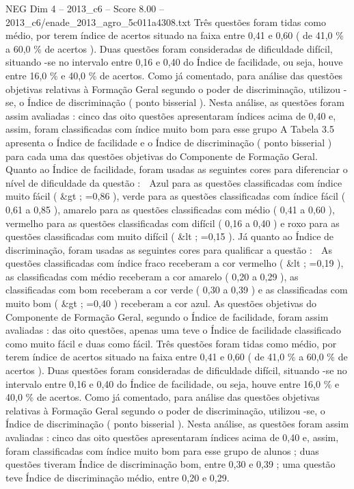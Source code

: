 \begin{textsample}{NEG Dim 4 – 2013\_c6 – Score 8.00 – 2013\_c6/enade\_2013\_agro\_5c011a4308.txt}
Três questões foram tidas como médio, por terem índice de acertos situado na faixa entre 0,41 e 0,60 ( de 41,0 \% a 60,0 \% de acertos ).
Duas questões foram consideradas de dificuldade difícil, situando -se no intervalo entre 0,16 e 0,40 do Índice de facilidade, ou seja, houve entre 16,0 \% e 40,0 \% de acertos.
Como já comentado, para análise das questões objetivas relativas à Formação Geral segundo o poder de discriminação, utilizou -se, o Índice de discriminação ( ponto bisserial ).
Nesta análise, as questões foram assim avaliadas : cinco das oito questões apresentaram índices acima de 0,40 e, assim, foram classificadas com índice muito bom para esse grupo A Tabela 3.5 apresenta o Índice de facilidade e o Índice de discriminação ( ponto bisserial ) para cada uma das questões objetivas do Componente de Formação Geral.
Quanto ao Índice de facilidade, foram usadas as seguintes cores para diferenciar o nível de dificuldade da questão :  Azul para as questões classificadas com índice muito fácil ( \&gt ; =0,86 ), verde para as questões classificadas com índice fácil ( 0,61 a 0,85 ), amarelo para as questões classificadas com médio ( 0,41 a 0,60 ), vermelho para as questões classificadas com difícil ( 0,16 a 0,40 ) e roxo para as questões classificadas com muito difícil ( \&lt ; =0,15 ).
Já quanto ao Índice de discriminação, foram usadas as seguintes cores para qualificar a questão :  As questões classificadas com índice fraco receberam a cor vermelho ( \&lt ; =0,19 ), as classificadas com médio receberam a cor amarelo ( 0,20 a 0,29 ), as classificadas com bom receberam a cor verde ( 0,30 a 0,39 ) e as classificadas com muito bom ( \&gt ; =0,40 ) receberam a cor azul.
As questões objetivas do Componente de Formação Geral, segundo o Índice de facilidade, foram assim avaliadas : das oito questões, apenas uma teve o Índice de facilidade classificado como muito fácil e duas como fácil.
Três questões foram tidas como médio, por terem índice de acertos situado na faixa entre 0,41 e 0,60 ( de 41,0 \% a 60,0 \% de acertos ).
Duas questões foram consideradas de dificuldade difícil, situando -se no intervalo entre 0,16 e 0,40 do Índice de facilidade, ou seja, houve entre 16,0 \% e 40,0 \% de acertos.
Como já comentado, para análise das questões objetivas relativas à Formação Geral segundo o poder de discriminação, utilizou -se, o Índice de discriminação ( ponto bisserial ).
Nesta análise, as questões foram assim avaliadas : cinco das oito questões apresentaram índices acima de 0,40 e, assim, foram classificadas com índice muito bom para esse grupo de alunos ; duas questões tiveram Índice de discriminação bom, entre 0,30 e 0,39 ; uma questão teve Índice de discriminação médio, entre 0,20 e 0,29.

\end{textsample}
